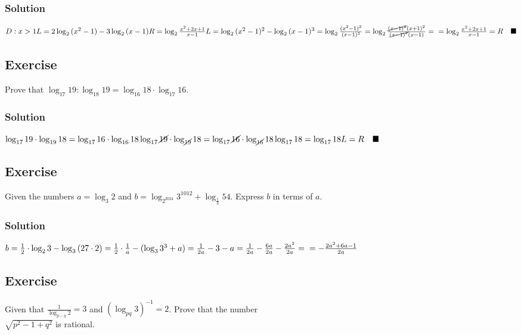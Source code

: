 \documentclass{article}
\begin{document}
\subsubsection*{Solution}
$
  D: x>1 \\
    \\
    L = 2\log_2{(x^2-1)} - 3\log_2{(x-1)} \\
    R = \log_2{\frac{x^2+2x+1}{x-1}} \\
    \\
    L = \log_2{(x^2-1)^2} - \log_2{(x-1)^3} = \log_2{\frac{(x^2-1)^2}{(x-1)^3}} = \log_2{\frac{\cancel{(x-1)^2}(x+1)^2}{\cancel{(x-1)^2}(x-1)}} = \\
    = \log_2{\frac{x^2+2x+1}{x-1}} = R \quad \blacksquare
$
\subsection{Exercise}
Prove that $\log_{17}{19} : \log_{18}{19} = \log_{16}{18} \cdot \log_{17}{16}$.
\subsubsection*{Solution}
$
  \log_{17}{19} \cdot \log_{19}{18} = \log_{17}{16} \cdot \log_{16}{18} \\
  \log_{17}{\cancel{19}} \cdot \log_{\cancel{19}}{18} = \log_{17}{\cancel{16}} \cdot \log_{\cancel{16}}{18} \\
  \log_{17}{18} = \log_{17}{18} \\
  L = R \quad \blacksquare
$
\subsection{Exercise}
Given the numbers $a=\log_3{2}$ and $b=\log_{2^{2024}}{3^{1012}} + \log_{\frac{1}{3}}{54}$. Express $b$ in terms of $a$.
\subsubsection*{Solution}
$
  b = \frac{1}{2} \cdot \log_2{3} - \log_3{(27 \cdot 2)} = \frac{1}{2} \cdot \frac{1}{a} - (\log_3{3^3} + a) = \frac{1}{2a} - 3 - a = \frac{1}{2a} - \frac{6a}{2a} - \frac{2a^2}{2a} = \\
    = - \frac{2a^2 +6a - 1}{2a}
$
\subsection{Exercise}
Given that $\frac{1}{\log_{p-q}{2}} = 3$ and $(\log_{pq}{3})^{-1}=2$. Prove that the number \\
$\sqrt{p^2 - 1 + q^2}$ is rational.
\end{document}
